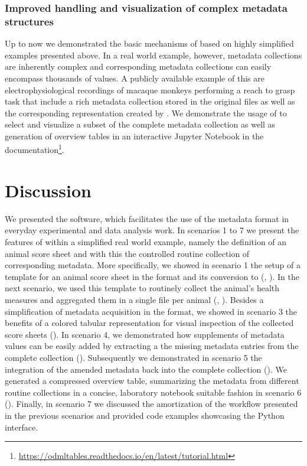 \subsubsection*{Improved handling and visualization of complex metadata structures}
Up to now we demonstrated the basic mechanisms of  based on highly simplified examples presented above. In a real world example, however, metadata collections are inherently complex and corresponding metadata collections can easily encompass thousands of values. A publicly available example of this are electrophysiological recordings of macaque monkeys performing a reach to grasp task that include a rich metadata collection stored in the original  files as well as the corresponding  representation created by  \citep{Brochier_2018}. We demonstrate the usage of  to select and visualize a subset of the complete metadata collection as well as generation of overview tables in an interactive Jupyter Notebook in the  documentation\footnote{\url{https://odmltables.readthedocs.io/en/latest/tutorial.html}}.

\section{Discussion}
\label{sec:Discussion}

We presented the  software, which facilitates the use of the  metadata format in everyday experimental and data analysis work. In scenarios 1 to 7 we present the features of  within a simplified real world example, namely the definition of an animal score sheet and with this the controlled routine collection of corresponding metadata. More specifically, we showed in scenario 1 the setup of a template for an animal score sheet in the  format and its conversion to  (\fconvert, \fgenerate). In the next scenario, we used this template to routinely collect the animal's health measures and aggregated them in a single  file per animal (\fconvert, \fmerge). Besides a simplification of metadata acquisition in the  format,  we showed in scenario 3 the benefits of a colored tabular representation for visual inspection of the collected score sheets (\fconvert). In scenario 4, we demonstrated how supplements of metadata values can be easily added by extracting a the missing metadata entries from the complete collection (\ffilter). Subsequently we demonstrated in scenario 5 the integration of the amended metadata back into the complete collection (\fmerge). We generated a compressed overview table, summarizing the metadata from different routine collections in a concise, laboratory notebook suitable fashion in scenario 6 (\fcompare). Finally, in scenario 7 we discussed the amortization of the workflow presented in the previous scenarios and provided code examples showcasing the  Python interface.

